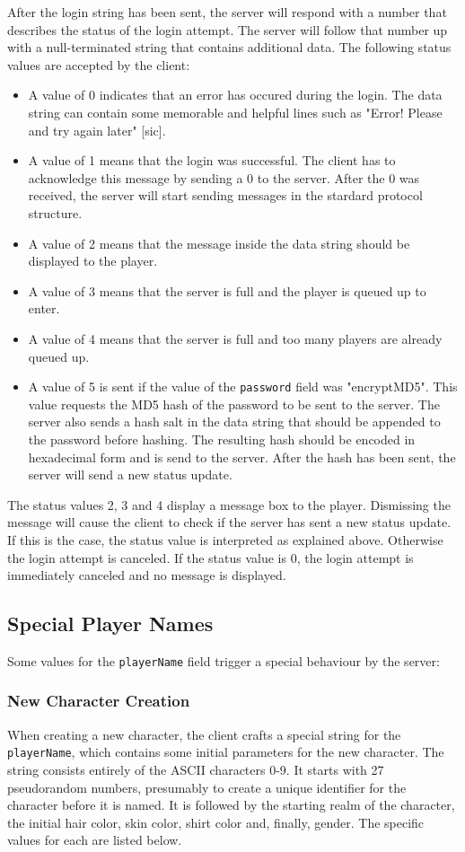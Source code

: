 \documentclass{article}
\newcommand{\field}[1]{\textcolor{fieldColor}{\texttt{#1}}}
\begin{document}
After the login string has been sent, the server will respond with a number that describes the status of the login attempt. The server will follow that number up with a null-terminated string that contains additional
data. The following status values are accepted by the client:

\begin{itemize}
\item A value of 0 indicates that an error has occured during the login. The data string can contain some memorable and helpful lines such as "Error! Please and try again later" [sic].
\item A value of 1 means that the login was successful. The client has to acknowledge this message by sending a 0 to the server. After the 0 was received, the server will start sending messages in the stardard protocol structure.
\item A value of 2 means that the message inside the data string should be displayed to the player.
\item A value of 3 means that the server is full and the player is queued up to enter.
\item A value of 4 means that the server is full and too many players are already queued up.
\item A value of 5 is sent if the value of the \field{password} field was "encryptMD5". This value requests the MD5 hash of the password to be sent to the server. The server also sends a hash salt in the data string
that should be appended to the password before hashing. The resulting hash should be encoded in hexadecimal form and is send to the server. After the hash has been sent, the server will send a new status update.
\end{itemize}

The status values 2, 3 and 4 display a message box to the player. Dismissing the message will cause the client to check if the server has sent a new status update. If this is the case, the status value is interpreted
as explained above. Otherwise the login attempt is canceled. If the status value is 0, the login attempt is immediately canceled and no message is displayed.

\subsection{Special Player Names}
Some values for the \field{playerName} field trigger a special behaviour by the server:

\subsubsection{New Character Creation}
When creating a new character, the client crafts a special string for the \field{playerName}, which contains some initial parameters for the new character. The string consists entirely of the ASCII characters
0-9. It starts with 27 pseudorandom numbers, presumably to create a unique identifier for the character before it is named. It is followed by the starting realm of the character, the initial hair color,
skin color, shirt color and, finally, gender. The specific values for each are listed below.
\end{document}
